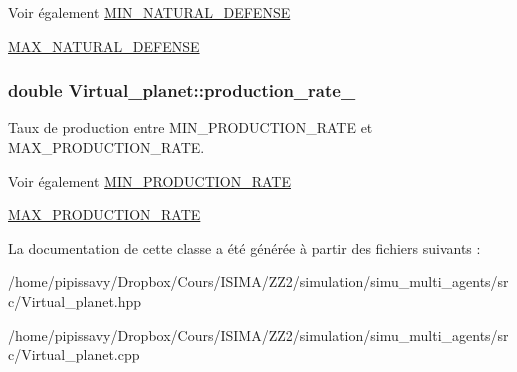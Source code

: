 \begin{DoxySeeAlso}{Voir également}
\hyperlink{classVirtual__planet_ae0e71188803de0af557c7a1db8bd2d95}{M\-I\-N\-\_\-\-N\-A\-T\-U\-R\-A\-L\-\_\-\-D\-E\-F\-E\-N\-S\-E} 

\hyperlink{classVirtual__planet_ad5b8a23606fded6c444a93136fceab0a}{M\-A\-X\-\_\-\-N\-A\-T\-U\-R\-A\-L\-\_\-\-D\-E\-F\-E\-N\-S\-E} 
\end{DoxySeeAlso}
\hypertarget{classVirtual__planet_a6f8de6a5104185b9c36c64a45260fab6}{
\subsubsection[{production\-\_\-rate\-\_\-}]{\setlength{\rightskip}{0pt plus 5cm}double Virtual\-\_\-planet\-::production\-\_\-rate\-\_\-\hspace{0.3cm}{\ttfamily [protected]}}}\label{classVirtual__planet_a6f8de6a5104185b9c36c64a45260fab6}


Taux de production entre M\-I\-N\-\_\-\-P\-R\-O\-D\-U\-C\-T\-I\-O\-N\-\_\-\-R\-A\-T\-E et M\-A\-X\-\_\-\-P\-R\-O\-D\-U\-C\-T\-I\-O\-N\-\_\-\-R\-A\-T\-E. 

\begin{DoxySeeAlso}{Voir également}
\hyperlink{classVirtual__planet_a5c08ee009e9d9d0b284b133e18c2b7f9}{M\-I\-N\-\_\-\-P\-R\-O\-D\-U\-C\-T\-I\-O\-N\-\_\-\-R\-A\-T\-E} 

\hyperlink{classVirtual__planet_a0899115c7ae16c4e07e6319209b678cc}{M\-A\-X\-\_\-\-P\-R\-O\-D\-U\-C\-T\-I\-O\-N\-\_\-\-R\-A\-T\-E} 
\end{DoxySeeAlso}


La documentation de cette classe a été générée à partir des fichiers suivants \-:\begin{DoxyCompactItemize}
\item 
/home/pipissavy/\-Dropbox/\-Cours/\-I\-S\-I\-M\-A/\-Z\-Z2/simulation/simu\-\_\-multi\-\_\-agents/src/Virtual\-\_\-planet.\-hpp\item 
/home/pipissavy/\-Dropbox/\-Cours/\-I\-S\-I\-M\-A/\-Z\-Z2/simulation/simu\-\_\-multi\-\_\-agents/src/Virtual\-\_\-planet.\-cpp\end{DoxyCompactItemize}
